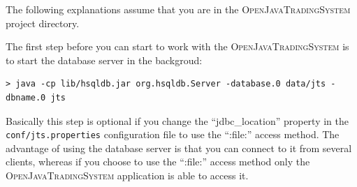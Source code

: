 \documentclass[a4paper,fleqn]{article}
\newcommand{\filesystempath}     [1]{\texttt{#1}}
\newcommand{\name}[1]{\textsc{#1}}
\newcommand{\OpenJavaTradingSystem}{\name{OpenJavaTradingSystem}}
\begin{document}
The following explanations assume that you are in the
\OpenJavaTradingSystem{} project directory.

The first step before you can start to work with the
\OpenJavaTradingSystem{} is to start the database server in the
backgroud:
\begin{verbatim}
> java -cp lib/hsqldb.jar org.hsqldb.Server -database.0 data/jts -dbname.0 jts
\end{verbatim}
Basically this step is optional if you change the ``jdbc\_location''
property in the \filesystempath{conf/jts.properties} configuration
file to use the ``:file:'' access method. The advantage of using the
database server is that you can connect to it from several clients,
whereas if you choose to use the ``:file:'' access method only the
\OpenJavaTradingSystem{} application is able to access it.
\end{document}
